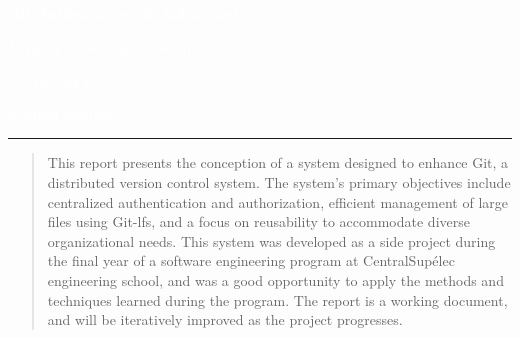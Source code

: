 \begin{titlepage}
\BgThispage
{}
\vspace*{0.25\textheight}
\noindent
\textcolor{white}{\Huge\textbf{\textsf{Git Authenticated \& Authorized}}}
\vspace*{0.25cm}\par
\noindent
\textcolor{white}{\Huge\textbf{\textsf{Large File Storage system}}}
\vspace*{0.25cm}\par
\noindent
\textcolor{white}{\huge\textbf{\textsf{(GAALAFIS)}}}
\vspace*{0.25cm}\par
\noindent
\textcolor{white}{\Large\textbf{\textsf{System analysis}}}
\vspace*{4cm}\par
\noindent
\begin{minipage}{0.35\linewidth}
    \begin{flushright}
        \printauthor
    \end{flushright}
\end{minipage} \hspace{15pt}
%
\begin{minipage}{0.02\linewidth}
    \rule{1pt}{175pt}
\end{minipage} \hspace{-10pt}
%
\begin{minipage}{0.63\linewidth}
\vspace{5pt}
    \begin{abstract} 
        This report presents the conception of a system designed to enhance Git, a distributed version control system. The system's primary objectives include centralized authentication and authorization, efficient management of large files using Git-lfs, and a focus on reusability to accommodate diverse organizational needs. This system was developed as a side project during the final year of a software engineering program at CentralSupélec engineering school, and was a good opportunity to apply the methods and techniques learned during the program. The report is a working document, and will be iteratively improved as the project progresses.
    \end{abstract}
\end{minipage}
\end{titlepage}
\restoregeometry
